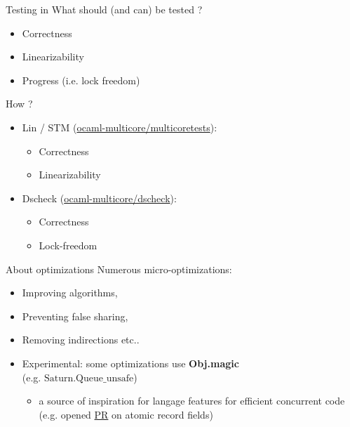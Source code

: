  \begin{frame}{Testing in \Saturn}
    What should (and can) be tested ?
    \begin{itemize}[label=$\bullet$]
     \item Correctness 
     \item Linearizability
     \item Progress (i.e. lock freedom) 
    \end{itemize}
    How ?
    \begin{itemize}[label=$\bullet$]
     \item Lin / STM (\href{https://github.com/ocaml-multicore/multicoretests}{ocaml-multicore/multicoretests}):
        \begin{itemize}[label=$\diamond$]
            \item Correctness
            \item Linearizability
        \end{itemize}
     \item Dscheck (\href{https://github.com/ocaml-multicore/dscheck}{ocaml-multicore/dscheck}):
     \begin{itemize}[label=$\diamond$]
        \item Correctness
        \item Lock-freedom
        \end{itemize}
    \end{itemize}
 
  \end{frame}



\begin{frame}{About optimizations}
    Numerous micro-optimizations:
    \begin{itemize}[label=$\diamond$]
        \item Improving algorithms,
        \item Preventing false sharing,
        \item Removing indirections etc..
        \item Experimental: some optimizations use \textbf{Obj.magic} \\(e.g. $\text{Saturn.Queue\_unsafe}$)
        \begin{itemize}[label=$\rightarrow$]
            \item<2-> a source of inspiration for langage features for efficient concurrent code (e.g. opened \href{https://github.com/ocaml/ocaml/pull/13404}{PR} on atomic record fields)
        \end{itemize}
    \end{itemize}
\end{frame}

